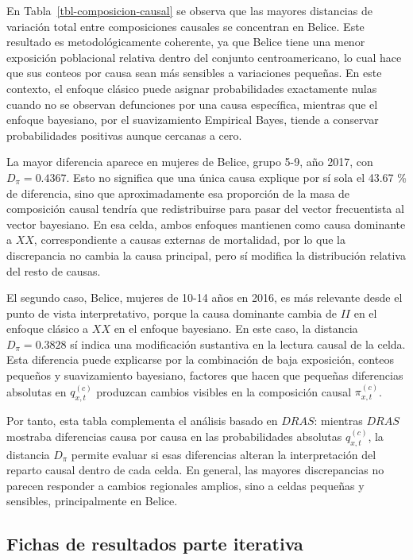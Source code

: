 \documentclass[
  spanish,
  letterpaper,
  DIV=11,
  numbers=noendperiod]{scrartcl}
\begin{document}
En Tabla~\ref{tbl-composicion-causal} se observa que las mayores
distancias de variación total entre composiciones causales se concentran
en Belice. Este resultado es metodológicamente coherente, ya que Belice
tiene una menor exposición poblacional relativa dentro del conjunto
centroamericano, lo cual hace que sus conteos por causa sean más
sensibles a variaciones pequeñas. En este contexto, el enfoque clásico
puede asignar probabilidades exactamente nulas cuando no se observan
defunciones por una causa específica, mientras que el enfoque bayesiano,
por el suavizamiento Empirical Bayes, tiende a conservar probabilidades
positivas aunque cercanas a cero.

La mayor diferencia aparece en mujeres de Belice, grupo 5-9, año 2017,
con \(D_{\pi}=0.4367\). Esto no significa que una única causa explique
por sí sola el 43.67 \% de diferencia, sino que aproximadamente esa
proporción de la masa de composición causal tendría que redistribuirse
para pasar del vector frecuentista al vector bayesiano. En esa celda,
ambos enfoques mantienen como causa dominante a \(XX\), correspondiente
a causas externas de mortalidad, por lo que la discrepancia no cambia la
causa principal, pero sí modifica la distribución relativa del resto de
causas.

El segundo caso, Belice, mujeres de 10-14 años en 2016, es más relevante
desde el punto de vista interpretativo, porque la causa dominante cambia
de \(II\) en el enfoque clásico a \(XX\) en el enfoque bayesiano. En
este caso, la distancia \(D_{\pi}=0.3828\) sí indica una modificación
sustantiva en la lectura causal de la celda. Esta diferencia puede
explicarse por la combinación de baja exposición, conteos pequeños y
suavizamiento bayesiano, factores que hacen que pequeñas diferencias
absolutas en \(q_{x,t}^{(c)}\) produzcan cambios visibles en la
composición causal \(\pi_{x,t}^{(c)}\).

Por tanto, esta tabla complementa el análisis basado en \(DRAS\):
mientras \(DRAS\) mostraba diferencias causa por causa en las
probabilidades absolutas \(q_{x,t}^{(c)}\), la distancia \(D_{\pi}\)
permite evaluar si esas diferencias alteran la interpretación del
reparto causal dentro de cada celda. En general, las mayores
discrepancias no parecen responder a cambios regionales amplios, sino a
celdas pequeñas y sensibles, principalmente en Belice.

\subsection{Fichas de resultados parte
iterativa}\label{fichas-de-resultados-parte-iterativa}
\end{document}
